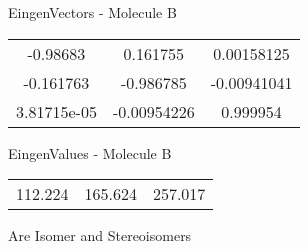 \begin{multicols}{2}
\begin{center}
\vtab
 EingenVectors - Molecule B     \\
\vtab
\begin{tabular}{|c c c|}
-0.98683	 & 	0.161755	 & 	0.00158125	 \\
-0.161763	 & 	-0.986785	 & 	-0.00941041	 \\
3.81715e-05	 & 	-0.00954226	 & 	0.999954
\end{tabular}

\vtab
 EingenValues - Molecule B     \\
\vtab
\begin{tabular}{|c c c|}
112.224	 & 	165.624	 & 	257.017
\end{tabular}

\end{center}
\end{multicols}
\begin{center}
\vtab
\vtab
\textcolor{NavyBlue}{\Large Are Isomer and Stereoisomers}
\end{center}
\newpage

